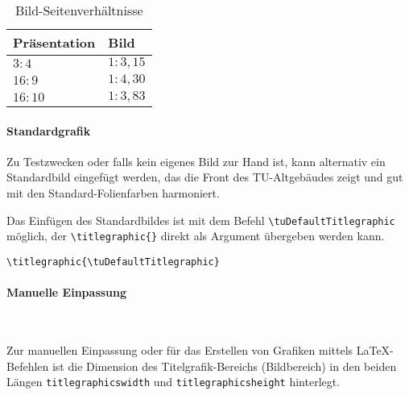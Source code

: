 \begin{table}[ht]
\centering
\begin{tabular}{ll}
\toprule
\bfseries Präsentation  & \bfseries  Bild  \\
\midrule
$3:4$   & $1:3{,}15$ \\
$16:9$  & $1:4{,}30$ \\
$16:10$ & $1:3{,}83$ \\
\bottomrule
\end{tabular}
\caption{Bild-Seitenverhältnisse}
\label{tab:picratio}
\end{table}



\paragraph{Standardgrafik}

Zu Testzwecken oder falls kein eigenes Bild zur Hand ist,
kann alternativ ein Standardbild eingefügt werden, das die Front
des TU-Altgebäudes zeigt und gut mit den Standard-Folienfarben harmoniert.

Das Einfügen des Standardbildes ist mit dem Befehl
\linebreak\lstinline{\tuDefaultTitlegraphic} möglich,
der \lstinline!\titlegraphic{}! direkt als Argument übergeben werden kann.

\begin{example}
\begin{lstlisting}
\titlegraphic{\tuDefaultTitlegraphic}
\end{lstlisting}
\end{example}


\paragraph{Manuelle Einpassung}\hfill

\begin{Declaration}
  \\
\end{Declaration}

Zur manuellen Einpassung oder für das Erstellen von Grafiken mittels
\LaTeX-Befehlen ist die Dimension des Titelgrafik-Bereichs (Bildbereich) in den
beiden Längen \lstinline{titlegraphicswidth} und \lstinline{titlegraphicsheight}
hinterlegt.

